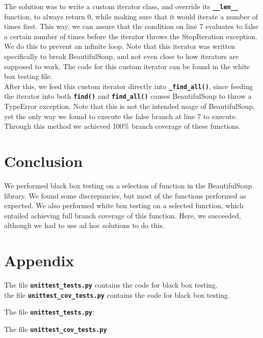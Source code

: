 \documentclass[10pt]{article}
\newcommand{\tbt}[1]{\texttt{\textbf{#1}}}
\begin{document}
The solution was to write a custom iterator class, and override its \tbt{\_\_len\_\_} function, to always return 0, while making sure that it would iterate a number of times first. This way, we can assure that the condition on line 7 evaluates to false a certain number of times before the iterator throws the StopIteration exception. We do this to prevent an infinite loop. Note that this iterator was written specifically to break BeautifulSoup, and not even close to how iterators are supposed to work. The code for this custom iterator can be found in the white box testing file. \\

After this, we feed this custom iterator directly into \tbt{\_find\_all()}, since feeding the iterator into both \tbt{find()} and \tbt{find\_all()} causes BeautifulSoup to throw a TypeError exception. Note that this is not the intended usage of BeautifulSoup, yet the only way we found to execute the false branch at line 7 to execute. \\

Through this method we achieved 100\% branch coverage of these functions. 






\section{Conclusion}

We performed black box testing on a selection of function in the BeautifulSoup library. We found some discrepancies, but most of the functions performed as expected. We also performed white box testing on a selected function, which entailed achieving full branch coverage of this function. Here, we succeeded, although we had to use ad hoc solutions to do this.

\section{Appendix}

The file \tbt{unittest\_tests.py} contains the code for black box testing. \\
the file \tbt{unittest\_cov\_tests.py} contains the code for black box testing. \\
\vspace{1em}

\begin{adjustwidth}{-6.5em}{0em}
The file \tbt{unittest\_tests.py}:
 
\vspace{1em}

The file \tbt{unittest\_cov\_tests.py}

\end{adjustwidth}
\end{document}
